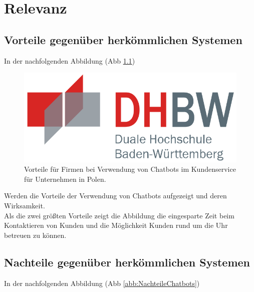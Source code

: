 \chapter{Relevanz} %
\label{cha:Relevanz}

\section{Vorteile gegenüber herkömmlichen Systemen} %
\label{sec:Vorteile gegenüber herkömmlichen Systemen}

In der nachfolgenden Abbildung (Abb \ref{abb:VorteileChatbotsPolen})

\begin{figure}[htb]
  \centering
  \includegraphics[width=12cm]{graphics/dhbw.png}
  \caption[Vorteile für Firmen bei Verwendung von Chatbots im Kundenservice für Unternehmen in Polen]{Vorteile für Firmen bei Verwendung von Chatbots im Kundenservice für Unternehmen in Polen. \footnotemark}
  \label{abb:VorteileChatbotsPolen}
\end{figure}

Werden die Vorteile der Verwendung von Chatbots aufgezeigt und deren Wirksamkeit. \\
Als die zwei größten Vorteile zeigt die Abbildung die eingesparte Zeit beim Kontaktieren von Kunden und die Möglichkeit Kunden rund um die Uhr betreuen zu können.


\section{Nachteile gegenüber herkömmlichen Systemen} %
\label{sec:Nachteile gegenüber herkömmlichen Systemen}

In der nachfolgenden Abbildung (Abb \ref{abb:NachteileChatbots})

